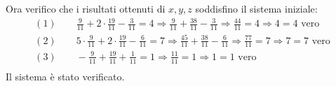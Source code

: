 \documentclass[italian]{article}
\begin{document}
Ora verifico che i risultati ottenuti di $x,y,z$ soddisfino il sistema iniziale:
\begin{gather*}
	(1) \qquad \frac{9}{11} + 2\cdot \frac{19}{11} - \frac{3}{11} = 4 \Rightarrow \frac{9}{11} + \frac{38}{11} - \frac{3}{11} \Rightarrow \frac{44}{11} = 4 \Rightarrow 4=4  \text{ vero}\\
	(2) \qquad 5\cdot \frac{9}{11} + 2\cdot \frac{19}{11} - \frac{6}{11} = 7 \Rightarrow \frac{45}{11} + \frac{38}{11} - \frac{6}{11} \Rightarrow \frac{77}{11} = 7 \Rightarrow 7=7  \text{ vero}\\
	(3) \qquad -\frac{9}{11} + \frac{19}{11} + \frac{1}{11} = 1 \Rightarrow \frac{11}{11} = 1 \Rightarrow 1=1  \text{ vero}\\
\end{gather*}
Il sistema è stato verificato.
\pagebreak\\
\end{document}
